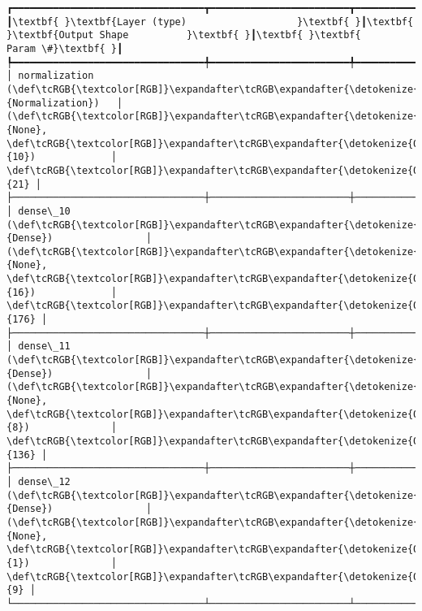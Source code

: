 \documentclass[11pt]{article}
\begin{document}
    
    
    \begin{Verbatim}[commandchars=\\\{\}]
┏━━━━━━━━━━━━━━━━━━━━━━━━━━━━━━━━━┳━━━━━━━━━━━━━━━━━━━━━━━━┳━━━━━━━━━━━━━━━┓
┃\textbf{ }\textbf{Layer (type)                   }\textbf{ }┃\textbf{ }\textbf{Output Shape          }\textbf{ }┃\textbf{ }\textbf{      Param \#}\textbf{ }┃
┡━━━━━━━━━━━━━━━━━━━━━━━━━━━━━━━━━╇━━━━━━━━━━━━━━━━━━━━━━━━╇━━━━━━━━━━━━━━━┩
│ normalization (\def\tcRGB{\textcolor[RGB]}\expandafter\tcRGB\expandafter{\detokenize{0,135,255}}{Normalization})   │ (\def\tcRGB{\textcolor[RGB]}\expandafter\tcRGB\expandafter{\detokenize{0,215,255}}{None}, \def\tcRGB{\textcolor[RGB]}\expandafter\tcRGB\expandafter{\detokenize{0,175,0}}{10})             │            \def\tcRGB{\textcolor[RGB]}\expandafter\tcRGB\expandafter{\detokenize{0,175,0}}{21} │
├─────────────────────────────────┼────────────────────────┼───────────────┤
│ dense\_10 (\def\tcRGB{\textcolor[RGB]}\expandafter\tcRGB\expandafter{\detokenize{0,135,255}}{Dense})                │ (\def\tcRGB{\textcolor[RGB]}\expandafter\tcRGB\expandafter{\detokenize{0,215,255}}{None}, \def\tcRGB{\textcolor[RGB]}\expandafter\tcRGB\expandafter{\detokenize{0,175,0}}{16})             │           \def\tcRGB{\textcolor[RGB]}\expandafter\tcRGB\expandafter{\detokenize{0,175,0}}{176} │
├─────────────────────────────────┼────────────────────────┼───────────────┤
│ dense\_11 (\def\tcRGB{\textcolor[RGB]}\expandafter\tcRGB\expandafter{\detokenize{0,135,255}}{Dense})                │ (\def\tcRGB{\textcolor[RGB]}\expandafter\tcRGB\expandafter{\detokenize{0,215,255}}{None}, \def\tcRGB{\textcolor[RGB]}\expandafter\tcRGB\expandafter{\detokenize{0,175,0}}{8})              │           \def\tcRGB{\textcolor[RGB]}\expandafter\tcRGB\expandafter{\detokenize{0,175,0}}{136} │
├─────────────────────────────────┼────────────────────────┼───────────────┤
│ dense\_12 (\def\tcRGB{\textcolor[RGB]}\expandafter\tcRGB\expandafter{\detokenize{0,135,255}}{Dense})                │ (\def\tcRGB{\textcolor[RGB]}\expandafter\tcRGB\expandafter{\detokenize{0,215,255}}{None}, \def\tcRGB{\textcolor[RGB]}\expandafter\tcRGB\expandafter{\detokenize{0,175,0}}{1})              │             \def\tcRGB{\textcolor[RGB]}\expandafter\tcRGB\expandafter{\detokenize{0,175,0}}{9} │
└─────────────────────────────────┴────────────────────────┴───────────────┘

    \end{Verbatim}

    
    
\end{document}
